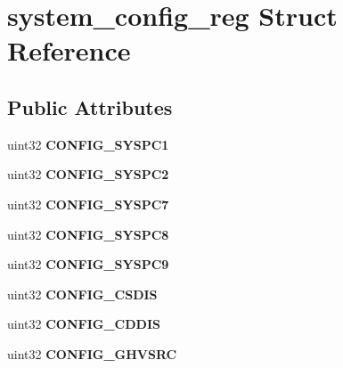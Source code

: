 \hypertarget{structsystem__config__reg}{}\section{system\+\_\+config\+\_\+reg Struct Reference}
\label{structsystem__config__reg}
\subsection*{Public Attributes}
\begin{DoxyCompactItemize}
\item 
\mbox{\label{structsystem__config__reg_aea17a5691de8e88865c27bca8bdd55aa}} 
uint32 {\bfseries C\+O\+N\+F\+I\+G\+\_\+\+S\+Y\+S\+P\+C1}
\item 
\mbox{\label{structsystem__config__reg_a4bad8eb7ece2f2966dc789d8dd02b9d6}} 
uint32 {\bfseries C\+O\+N\+F\+I\+G\+\_\+\+S\+Y\+S\+P\+C2}
\item 
\mbox{\label{structsystem__config__reg_a1bae3e01bc2f6bfb6e335c2893b8c58b}} 
uint32 {\bfseries C\+O\+N\+F\+I\+G\+\_\+\+S\+Y\+S\+P\+C7}
\item 
\mbox{\label{structsystem__config__reg_a52512c180b2885e9b8650f187e8c598c}} 
uint32 {\bfseries C\+O\+N\+F\+I\+G\+\_\+\+S\+Y\+S\+P\+C8}
\item 
\mbox{\label{structsystem__config__reg_ac66158909a7fb58e9addc2105cf9dd67}} 
uint32 {\bfseries C\+O\+N\+F\+I\+G\+\_\+\+S\+Y\+S\+P\+C9}
\item 
\mbox{\label{structsystem__config__reg_ade8dceed7bfcc631c8fe8d4213643554}} 
uint32 {\bfseries C\+O\+N\+F\+I\+G\+\_\+\+C\+S\+D\+IS}
\item 
\mbox{\label{structsystem__config__reg_a8b003e339f44c6dfdc14afee57a412a6}} 
uint32 {\bfseries C\+O\+N\+F\+I\+G\+\_\+\+C\+D\+D\+IS}
\item 
\mbox{\label{structsystem__config__reg_afb686613bfca3c2e2c9ef2e9f2d2c860}} 
uint32 {\bfseries C\+O\+N\+F\+I\+G\+\_\+\+G\+H\+V\+S\+RC}

\end{DoxyCompactItemize}
